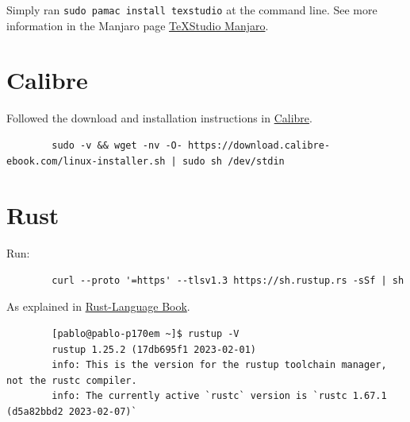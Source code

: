 \documentclass[]{scrartcl}
\begin{document}
Simply ran \texttt{sudo pamac install texstudio} at the command line.
See more information in the Manjaro page  \href{https://software.manjaro.org/package/texstudio}{\TeX{}Studio Manjaro}.


\section{Calibre}

Followed the download and installation instructions in \href{https://calibre-ebook.com/download_linux}{Calibre}.

\begin{footnotesize}
	\begin{verbatim}
		sudo -v && wget -nv -O- https://download.calibre-ebook.com/linux-installer.sh | sudo sh /dev/stdin
	\end{verbatim}
\end{footnotesize}

\section{Rust}


Run:

\begin{footnotesize}
	\begin{verbatim}
		curl --proto '=https' --tlsv1.3 https://sh.rustup.rs -sSf | sh
	\end{verbatim}
\end{footnotesize}

As explained in \href{https://doc.rust-lang.org/book/ch01-01-installation.html}{Rust-Language Book}.

\begin{footnotesize}
	\begin{verbatim}
		[pablo@pablo-p170em ~]$ rustup -V
		rustup 1.25.2 (17db695f1 2023-02-01)
		info: This is the version for the rustup toolchain manager, not the rustc compiler.
		info: The currently active `rustc` version is `rustc 1.67.1 (d5a82bbd2 2023-02-07)`
	\end{verbatim}
\end{footnotesize}
\end{document}

